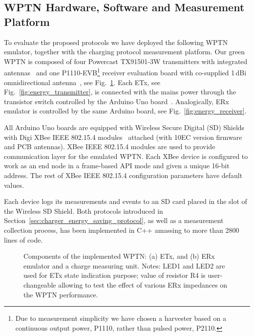 \documentclass[11pt,draftclsnofoot,journal,onecolumn]{IEEEtran}
\begin{document}
\subsection{WPTN Hardware, Software and Measurement Platform}
\label{sec:wptn_network_hardware}

To evaluate the proposed protocols we have deployed the following WPTN emulator, together with the charging protocol measurement platform. Our green WPTN is composed of four Powercast TX91501-3W transmitters with integrated antennas~\cite[/products/powercaster-transmitters]{powercast_website} and one P1110-EVB\footnote{Due to measurement simplicity we have chosen a harvester based on a continuous output power, P1110, rather than pulsed power, P2110.} receiver evaluation board with co-supplied 1\,dBi omnidirectional antenna~\cite[/products/development-kits]{powercast_website}, see Fig.~\ref{fig:wptn_hardware}. Each ETx, see Fig.~\ref{fig:energy_transmitter}, is connected with the mains power through the transistor switch controlled by the Arduino Uno board~\cite[/arduinoBoardUno]{arduino_website}. Analogically, ERx emulator is controlled by the same Arduino board, see Fig.~\ref{fig:energy_receiver}. 

All Arduino Uno boards are equipped with Wireless Secure Digital (SD) Shields~\cite[/ArduinoWirelessShield]{arduino_website} with Digi XBee IEEE 802.15.4 modules~\cite{xbee_website} attached (with 10EC version firmware and PCB antennas). XBee IEEE 802.15.4 modules are used to provide communication layer for the emulated WPTN. Each XBee device is configured to work as an end node in a frame-based API mode and given a unique 16-bit address. The rest of XBee IEEE 802.15.4 configuration parameters have default values. 

Each device logs its measurements and events to an SD card placed in the slot of the Wireless SD Shield. Both protocols introduced in Section~\ref{sec:charger_energy_saving_protocol}, as well as a measurement collection process, has been implemented in C++ amassing to more than 2800 lines of code.

\begin{figure}
\centering
{}
\caption{Components of the implemented WPTN: (a) ETx, and (b) ERx emulator and a charge measuring unit. Notes: LED1 and LED2 are used for ETx state indication purpose; value of resistor R4 is user-changeable allowing to test the effect of various ERx impedances on the WPTN performance.}
\label{fig:wptn_hardware}
\end{figure}
\end{document}
